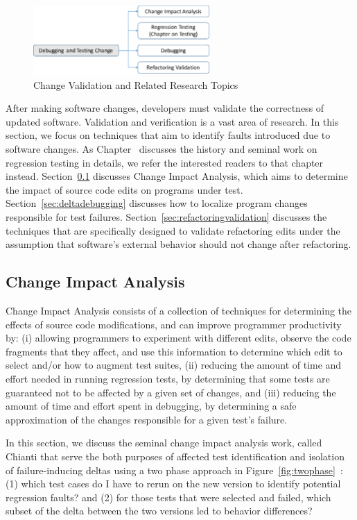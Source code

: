 \begin{figure}[ht]
 \centering
 \includegraphics[width=0.6\textwidth]{images/ChangeValidation.pdf} 
 \caption{Change Validation and Related Research Topics} 
 \label{fig:changevalidation} 
\end{figure}

After making software changes, developers must validate the correctness of updated software. Validation and verification is a vast area of research. In this section, we focus on techniques that aim to identify faults introduced due to software changes. As Chapter~ discusses the history and seminal work on regression testing in details, we refer the interested readers to that chapter instead. Section~\ref{sec:CIA} discusses Change Impact Analysis, which aims to determine the impact of source code edits on programs under test. Section~\ref{sec:deltadebugging} discusses how to localize program changes responsible for test failures. Section~\ref{sec:refactoringvalidation} discusses the techniques that are specifically designed to validate refactoring edits under the assumption that software's external behavior should not change after refactoring. 

\subsection{Change Impact Analysis} 
\label{sec:CIA} 
Change Impact Analysis consists of a collection of techniques for determining the effects of source code modifications, and can improve programmer productivity by: (i) allowing programmers to experiment with different edits, observe the code fragments that they affect, and use this information to determine which edit to select and/or how to augment test suites, (ii) reducing the amount of time and effort needed in running regression tests, by determining that some tests are guaranteed not to be affected by a given set of changes, and (iii) reducing the amount of time and effort spent in debugging, by determining a safe approximation of the changes responsible for a given test’s failure. 

In this section, we discuss the seminal change impact analysis work, called Chianti that serve the both purposes of affected test identification and isolation of failure-inducing deltas using a two phase approach in Figure~\ref{fig:twophase}~\cite{Ren2004}: (1) which test cases do I have to rerun on the new version to identify potential regression faults? and (2) for those tests that were selected and failed, which subset of the delta between the two versions led to behavior differences?  

